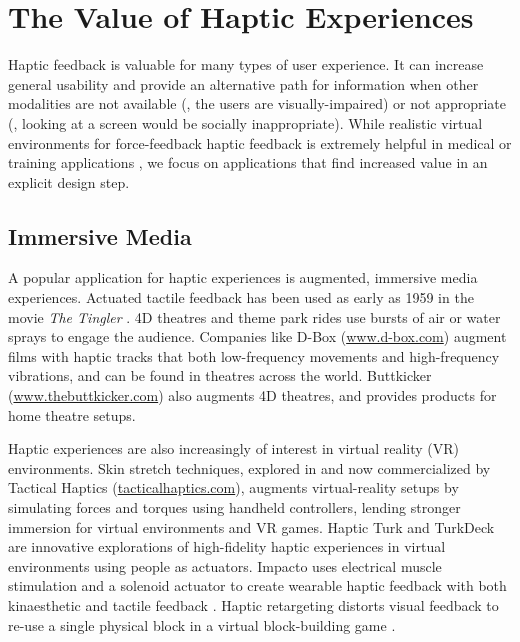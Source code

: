 %

%
%
\section{The Value of Haptic Experiences}
Haptic feedback is valuable for many types of user experience.
It can increase general usability and provide an alternative path for information when other modalities are not available (\eg, the users are visually-impaired) or not appropriate (\eg, looking at a screen would be socially inappropriate).
While realistic virtual environments for force-feedback haptic feedback is extremely helpful in medical or training applications , we focus on applications that find increased value in an explicit design step.

\subsection{Immersive Media}
A popular application for haptic experiences is augmented, immersive media experiences.
Actuated tactile feedback has been used as early as 1959 in the movie \emph{The Tingler}  \cite{IJsselsteijn2003}.
4D theatres and theme park rides use bursts of air or water sprays to engage the audience.
Companies like D-Box (\url{www.d-box.com}) augment films with haptic tracks that both low-frequency movements and high-frequency vibrations, and can be found in theatres across the world.
Buttkicker (\url{www.thebuttkicker.com}) also augments 4D theatres, and provides products for home theatre setups.

Haptic experiences are also increasingly of interest in virtual reality (VR) environments.
Skin stretch techniques, explored in \cite{Guinan2014} and now commercialized by Tactical Haptics (\url{tacticalhaptics.com}), augments virtual-reality setups by simulating forces and torques using handheld controllers, lending stronger immersion for virtual environments and VR games.
Haptic Turk \cite{Cheng2014} and TurkDeck \cite{Cheng2015} are innovative explorations of high-fidelity haptic experiences in virtual environments using people as actuators.
Impacto uses electrical muscle stimulation and a solenoid actuator to create wearable haptic feedback with both kinaesthetic and tactile feedback \cite{Lopes2015}.
Haptic retargeting distorts visual feedback to re-use a single physical block in a virtual block-building game \cite{Azmandian2016}.

